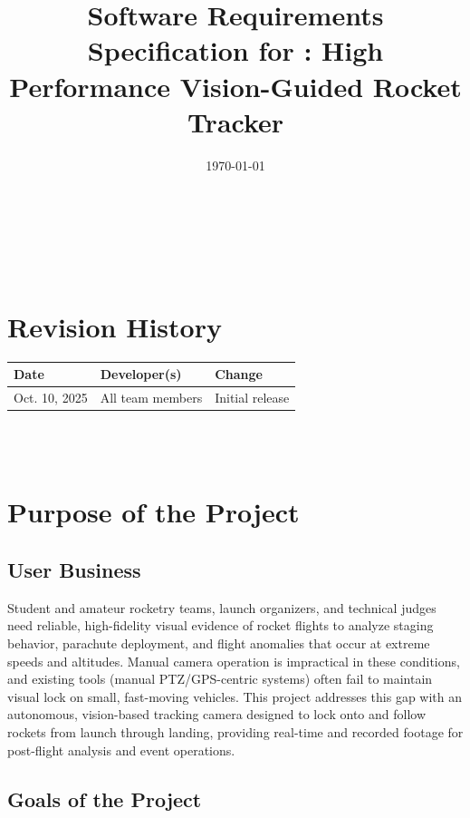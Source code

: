 \documentclass[12pt]{article}
\begin{document}
\title{Software Requirements Specification for \progname: High Performance Vision-Guided Rocket Tracker}
\author{\authname}
\date{\today}

\maketitle

~\newpage

\tableofcontents

~\newpage

\section*{Revision History}

\begin{tabularx}{\textwidth}{llX}
  \toprule {\textbf{Date}} & {\textbf{Developer(s)}} & {\textbf{Change}} \\
  \midrule
  Oct. 10, 2025            & All team members        & Initial release   \\
  \bottomrule
\end{tabularx}

~\\

~\newpage
\section{Purpose of the Project}
\subsection{User Business}

Student and amateur rocketry teams, launch organizers, and technical judges
need reliable, high-fidelity visual evidence of rocket flights to analyze
staging behavior, parachute deployment, and flight anomalies that occur at
extreme speeds and altitudes. Manual camera operation is impractical in these
conditions, and existing tools (manual PTZ/GPS-centric systems) often fail to
maintain visual lock on small, fast-moving vehicles. This project addresses
this gap with an autonomous, vision-based tracking camera designed to lock onto
and follow rockets from launch through landing, providing real-time and
recorded footage for post-flight analysis and event operations.

\subsection{Goals of the Project}
\end{document}
